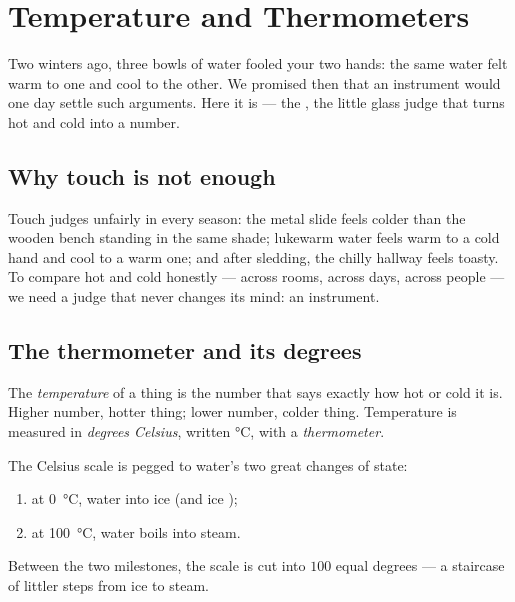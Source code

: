 \chapter{Temperature and Thermometers}\label{ch:g3:temperature-thermometers}

Two winters ago, three bowls of water fooled your two hands: the
same water felt warm to one and cool to the other. We promised then
that an instrument would one day settle such arguments. Here it is
--- the , the little glass judge that turns hot and cold
into a number.

\section{Why touch is not enough}

\begin{example}\label{ex:g3:temperature-thermometers:unfair}
Touch judges unfairly in every season: the metal slide feels colder
than the wooden bench standing in the same shade; lukewarm water
feels warm to a cold hand and cool to a warm one; and after sledding,
the chilly hallway feels toasty. To compare hot and cold honestly ---
across rooms, across days, across people --- we need a judge that
never changes its mind: an instrument.
\end{example}

\section{The thermometer and its degrees}

\begin{definition}[Temperature]\label{def:g3:temperature-thermometers:temperature}
The \emph{temperature} of a thing is the number
that says exactly how hot or cold it is. Higher number, hotter
thing; lower number, colder thing. Temperature is measured in
\emph{degrees Celsius}, written \unit{\celsius},
with a \emph{thermometer}.
\end{definition}

\begin{proposition}\label{prop:g3:temperature-thermometers:milestones}
The Celsius scale is pegged to water's two great changes of state:
\begin{enumerate}
  \item at \qty{0}{\celsius}, water  into ice (and ice );
  \item at \qty{100}{\celsius}, water boils into steam.
\end{enumerate}
Between the two milestones, the scale is cut into $100$ equal
degrees --- a staircase of littler steps from ice to steam.
\end{proposition}

